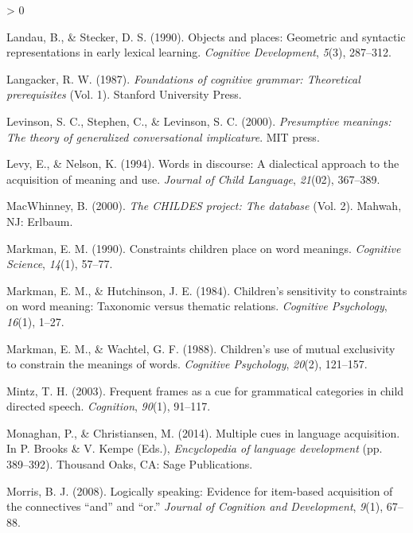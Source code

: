 \documentclass[
  english,
  ,man,floatsintext]{apa6}
\newlength{\cslhangindent}
\newenvironment{CSLReferences}[2] %
 {%
  \setlength{\parindent}{0pt}
  \ifodd #1 \everypar{\setlength{\hangindent}{\cslhangindent}}\ignorespaces\fi
  \ifnum #2 > 0
  \setlength{\parskip}{#2\baselineskip}
  \fi
 }%
 {}
\begin{document}
\begin{CSLReferences}{1}{0}
\leavevmode\hypertarget{ref-landau1990objects}{}%
Landau, B., \& Stecker, D. S. (1990). Objects and places: Geometric and syntactic representations in early lexical learning. \emph{Cognitive Development}, \emph{5}(3), 287--312.

\leavevmode\hypertarget{ref-langacker1987foundations}{}%
Langacker, R. W. (1987). \emph{Foundations of cognitive grammar: Theoretical prerequisites} (Vol. 1). {S}tanford {U}niversity {P}ress.

\leavevmode\hypertarget{ref-levinson2000presumptive}{}%
Levinson, S. C., Stephen, C., \& Levinson, S. C. (2000). \emph{Presumptive meanings: The theory of generalized conversational implicature}. MIT press.

\leavevmode\hypertarget{ref-levy1994words}{}%
Levy, E., \& Nelson, K. (1994). Words in discourse: A dialectical approach to the acquisition of meaning and use. \emph{Journal of Child Language}, \emph{21}(02), 367--389.

\leavevmode\hypertarget{ref-macwhinney2000childes}{}%
MacWhinney, B. (2000). \emph{The {CHILDES} project: The database} (Vol. 2). Mahwah, NJ: Erlbaum.

\leavevmode\hypertarget{ref-markman1990constraints}{}%
Markman, E. M. (1990). Constraints children place on word meanings. \emph{Cognitive Science}, \emph{14}(1), 57--77.

\leavevmode\hypertarget{ref-markman1984children}{}%
Markman, E. M., \& Hutchinson, J. E. (1984). Children's sensitivity to constraints on word meaning: Taxonomic versus thematic relations. \emph{Cognitive Psychology}, \emph{16}(1), 1--27.

\leavevmode\hypertarget{ref-markman1988children}{}%
Markman, E. M., \& Wachtel, G. F. (1988). Children's use of mutual exclusivity to constrain the meanings of words. \emph{Cognitive Psychology}, \emph{20}(2), 121--157.

\leavevmode\hypertarget{ref-mintz2003frequent}{}%
Mintz, T. H. (2003). Frequent frames as a cue for grammatical categories in child directed speech. \emph{Cognition}, \emph{90}(1), 91--117.

\leavevmode\hypertarget{ref-monaghan2014multiple}{}%
Monaghan, P., \& Christiansen, M. (2014). Multiple cues in language acquisition. In P. Brooks \& V. Kempe (Eds.), \emph{Encyclopedia of language development} (pp. 389--392). Thousand Oaks, CA: Sage Publications.

\leavevmode\hypertarget{ref-morris2008logically}{}%
Morris, B. J. (2008). Logically speaking: Evidence for item-based acquisition of the connectives {``and''} and {``or.''} \emph{Journal of Cognition and Development}, \emph{9}(1), 67--88.


\end{CSLReferences}
\end{document}
